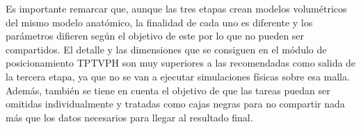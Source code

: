 


Es importante remarcar que, aunque las tres etapas crean modelos volumétricos del mismo modelo anatómico, la finalidad de cada uno es diferente y los parámetros difieren según el objetivo de este\new{,} por lo que no pueden ser compartidos. El detalle y las dimensiones que se consiguen en el módulo de posicionamiento \ac{TPTVPH} son muy superiores a las recomendadas como salida de la tercera etapa, ya que no se van a ejecutar simulaciones físicas sobre esa malla. Además, también se tiene en cuenta el objetivo de que las tareas puedan ser omitidas individualmente y tratadas como cajas negras para no compartir nada más que los datos necesarios para llegar al resultado final.




